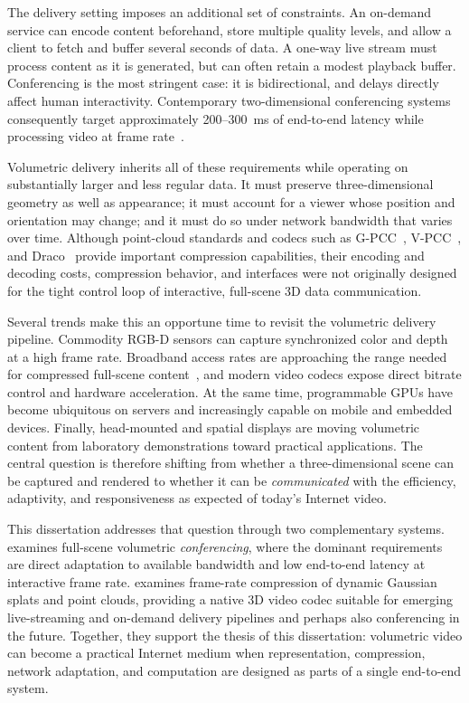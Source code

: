 %
The delivery setting imposes an additional set of constraints.
%
An on-demand service can encode content beforehand, store multiple quality levels, and allow a client to fetch and buffer several seconds of data. 
%
A one-way live stream must process content as it is generated, but can often retain a modest playback buffer.
%
Conferencing is the most stringent case: it is bidirectional, and delays directly affect human interactivity.
%
Contemporary two-dimensional conferencing systems consequently target approximately 200--300~ms of end-to-end latency while processing video at frame rate~\cite{videoconf-benchmark,salsify,converge-sigcomm-2023,rfec-acm-mm2022}.

Volumetric delivery inherits all of these requirements while operating on substantially larger and less regular data. 
%
It must preserve three-dimensional geometry as well as appearance; it must account for a viewer whose position and orientation may change; and it must do so under network bandwidth that varies over time. 
%
Although point-cloud standards and codecs such as G-PCC~\cite{gpcc}, V-PCC~\cite{vpcc}, and Draco~\cite{draco} provide important compression capabilities, their encoding and decoding costs, compression behavior, and interfaces were not originally designed for the tight control loop of interactive, full-scene 3D data communication.

Several trends make this an opportune time to revisit the volumetric delivery pipeline. 
%
Commodity RGB-D sensors can capture synchronized color and depth at a high frame rate.
%
Broadband access rates are approaching the range needed for compressed full-scene content~\cite{cisco_whitepaper}, and modern video codecs expose direct bitrate control and hardware acceleration. 
%
At the same time, programmable GPUs have become ubiquitous on servers and increasingly capable on mobile and embedded devices. 
%
Finally, head-mounted and spatial displays are moving volumetric content from laboratory demonstrations toward practical applications.
%
The central question is therefore shifting from whether a three-dimensional scene can be captured and rendered to whether it can be \textit{communicated} with the efficiency, adaptivity, and responsiveness as expected of today's Internet video.

This dissertation addresses that question through two complementary systems.
%
\livo examines full-scene volumetric \textit{conferencing}, where the dominant requirements are direct adaptation to available bandwidth and low end-to-end latency at interactive frame rate.
%
\gsnfs examines frame-rate compression of dynamic Gaussian splats and point clouds, providing a native 3D video codec suitable for emerging live-streaming and on-demand delivery pipelines and perhaps also conferencing in the future.
%
Together, they support the thesis of this dissertation: volumetric video can become a practical Internet medium when representation, compression, network adaptation, and computation are designed as parts of a single end-to-end system.


